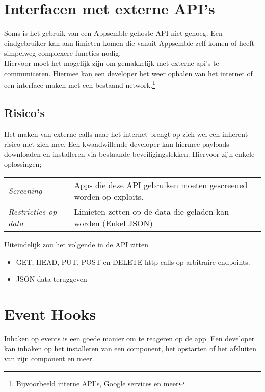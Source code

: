 \section{Interfacen met externe API's}

Soms is het gebruik van een Appsemble-gehoste API niet genoeg. Een eindgebruiker kan aan limieten komen die vanuit Appsemble zelf komen of heeft simpelweg complexere functies nodig. \\ 

Hiervoor moet het mogelijk zijn om gemakkelijk met externe api's te communiceren. Hiermee kan een developer het weer ophalen van het internet of een interface maken met een bestaand network.\footnote{Bijvoorbeeld interne API's, Google services en meer}

\subsection{Risico's}

Het maken van externe calls naar het internet brengt op zich wel een inherent risico met zich mee. Een kwaadwillende developer kan hiermee payloads downloaden en installeren via bestaande beveiligingslekken. Hiervoor zijn enkele oplossingen; \\

\begin{tabular} { l | l }
	\emph{Screening} & Apps die deze API gebruiken moeten gescreened worden op exploits. \\
	\emph{Restricties op data} & Limieten zetten op de data die geladen kan worden (Enkel JSON) \\
\end{tabular}

Uiteindelijk zou het volgende in de API zitten

\begin{itemize}
	\item GET, HEAD, PUT, POST en DELETE http calls op arbitraire endpoints.
	\item JSON data teruggeven
\end{itemize}

\section{Event Hooks}

Inhaken op events is een goede manier om te reageren op de app. Een developer kan inhaken op het installeren van een component, het opstarten of het afsluiten van zijn component en meer.  \\

